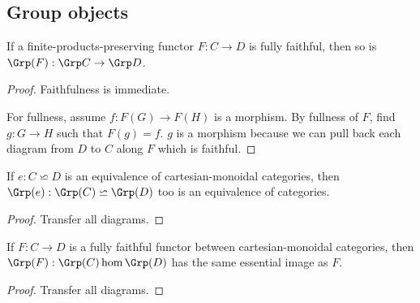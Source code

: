 \subsection{Group objects}


\begin{proposition}
  \label{0-full-faithful-grp}
  \uses{}
  \leanok

  If a finite-products-preserving functor $F : C \to D$ is fully faithful,
  then so is $\Grp(F) : \Grp C \to \Grp D$.
\end{proposition}
\begin{proof}
  \uses{}
  \leanok

  Faithfulness is immediate.

  For fullness, assume $f : F(G) \to F(H)$ is a morphism. By fullness of $F$,
  find $g : G \to H$ such that $F(g) = f$. $g$ is a morphism
  because we can pull back each diagram from $D$ to $C$ along $F$ which is faithful.
\end{proof}


\begin{proposition}
  \label{0-grp-equiv}
  \uses{}
  \leanok

  If $e : C \backsimeq D$ is an equivalence of cartesian-monoidal categories,
  then $\Grp(e) : \Grp(C) \backsimeq \Grp(D)$ too is an equivalence of categories.
\end{proposition}
\begin{proof}
  \uses{}
  \leanok

  Transfer all diagrams.
\end{proof}


\begin{proposition}
  \label{0-ess-image-grp}
  \uses{}
  \leanok

  If $F : C \to D$ is a fully faithful functor between cartesian-monoidal categories,
  then $\Grp(F) : \Grp(C) \hom \Grp(D)$ has the same essential image as $F$.
\end{proposition}
\begin{proof}
  \leanok

  Transfer all diagrams.
\end{proof}


